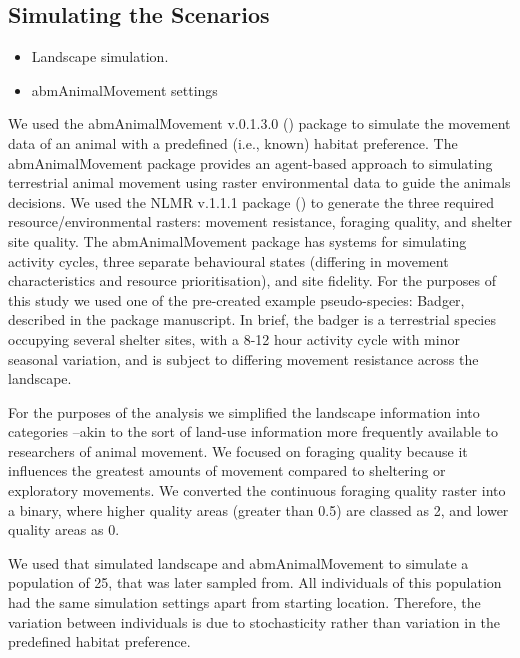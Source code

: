 \documentclass[10pt,a4paper]{article}
\begin{document}
\subsection{Simulating the Scenarios}\label{simulating-the-scenarios}

\begin{itemize}
\item
  Landscape simulation.
\item
  abmAnimalMovement settings
\end{itemize}

We used the abmAnimalMovement v.0.1.3.0 () package to simulate the movement data of an animal with a predefined (i.e., known) habitat preference.
The abmAnimalMovement package provides an agent-based approach to simulating terrestrial animal movement using raster environmental data to guide the animals decisions.
We used the NLMR v.1.1.1 package () to generate the three required resource/environmental rasters: movement resistance, foraging quality, and shelter site quality.
The abmAnimalMovement package has systems for simulating activity cycles, three separate behavioural states (differing in movement characteristics and resource prioritisation), and site fidelity.
For the purposes of this study we used one of the pre-created example pseudo-species: Badger, described in the package manuscript.
In brief, the badger is a terrestrial species occupying several shelter sites, with a 8-12 hour activity cycle with minor seasonal variation, and is subject to differing movement resistance across the landscape.

For the purposes of the analysis we simplified the landscape information into categories --akin to the sort of land-use information more frequently available to researchers of animal movement.
We focused on foraging quality because it influences the greatest amounts of movement compared to sheltering or exploratory movements.
We converted the continuous foraging quality raster into a binary, where higher quality areas (greater than 0.5) are classed as 2, and lower quality areas as 0.

We used that simulated landscape and abmAnimalMovement to simulate a population of 25, that was later sampled from.
All individuals of this population had the same simulation settings apart from starting location.
Therefore, the variation between individuals is due to stochasticity rather than variation in the predefined habitat preference.
\end{document}
